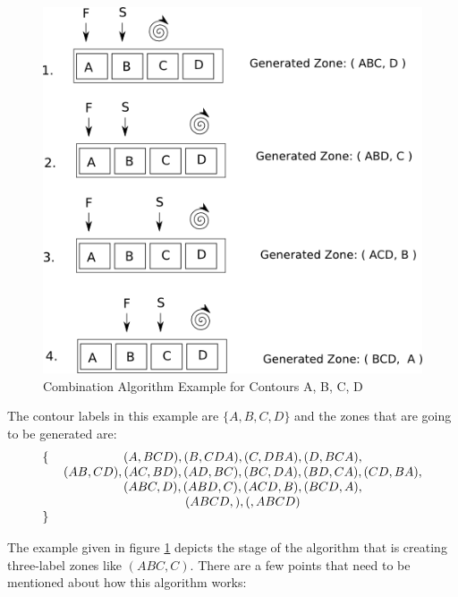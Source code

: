 \documentclass[10pt, a4paper, titlepage]{article}
\begin{document}
\begin{figure}[h]
\centering
\includegraphics[scale=0.8]{images/combination.png}
\caption{Combination Algorithm Example for Contours {A, B, C, D} }
\label{combination}
\end{figure}

The contour labels in this example are  $ \lbrace  A , B, C, D \rbrace $ and the zones that are going to be generated are:
$$
\begin{tabular}{ r c l }
 	\(\lbrace \)  & \((A, BCD) , (B, CDA) , (C, DBA), (D, BCA), \)\\
   & \((AB, CD), (AC, BD), (AD, BC), (BC, DA), (BD, CA), (CD, BA), \)\\
   & \((ABC, D) , ( ABD, C) , (ACD, B), (BCD, A), \)\\
   & \( (ABCD, ), ( , ABCD)  \)\\
	\(\rbrace \)	
\end{tabular}
$$

The example given in figure \ref{combination} depicts the stage of the algorithm that is creating three-label zones like $ (ABC , C) $. There are a few points that need to be mentioned about how this algorithm works:
\end{document}
